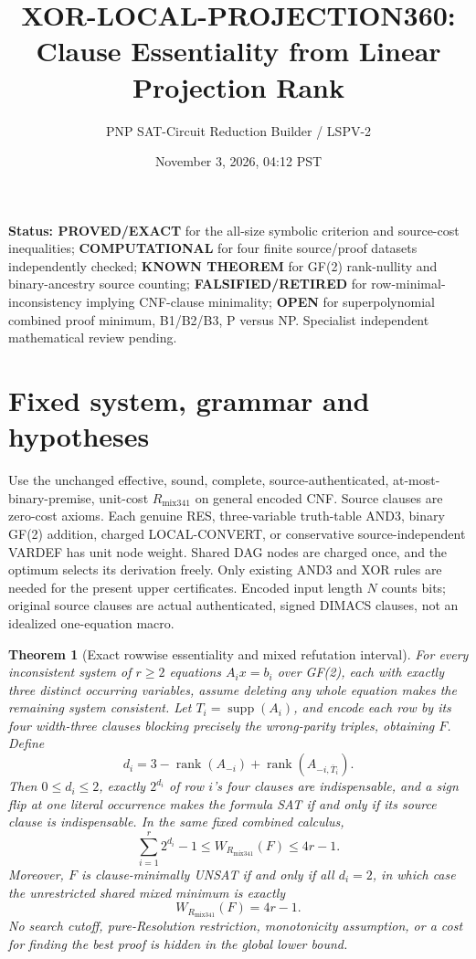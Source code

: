\documentclass[11pt]{article}
\title{XOR-LOCAL-PROJECTION360: Clause Essentiality from Linear Projection Rank}
\author{PNP SAT-Circuit Reduction Builder / LSPV-2}
\date{November 3, 2026, 04:12 PST}
\newtheorem{theorem}{Theorem}
\begin{document}
\maketitle
\noindent\textbf{Status: PROVED/EXACT} for the all-size symbolic criterion and source-cost inequalities; \textbf{COMPUTATIONAL} for four finite source/proof datasets independently checked; \textbf{KNOWN THEOREM} for GF(2) rank-nullity and binary-ancestry source counting; \textbf{FALSIFIED/RETIRED} for row-minimal-inconsistency implying CNF-clause minimality; \textbf{OPEN} for superpolynomial combined proof minimum, B1/B2/B3, P versus NP. Specialist independent mathematical review pending.

\section*{Fixed system, grammar and hypotheses}
Use the unchanged effective, sound, complete, source-authenticated, at-most-binary-premise, unit-cost $R_{\mathrm{mix341}}$ on general encoded CNF. Source clauses are zero-cost axioms. Each genuine RES, three-variable truth-table AND3, binary GF(2) addition, charged LOCAL-CONVERT, or conservative source-independent VARDEF has unit node weight. Shared DAG nodes are charged once, and the optimum selects its derivation freely. Only existing AND3 and XOR rules are needed for the present upper certificates. Encoded input length $N$ counts bits; original source clauses are actual authenticated, signed DIMACS clauses, not an idealized one-equation macro.

\begin{theorem}[Exact rowwise essentiality and mixed refutation interval]
For every inconsistent system of $r\ge2$ equations $A_ix=b_i$ over GF(2), each with exactly three distinct occurring variables, assume deleting any whole equation makes the remaining system consistent. Let $T_i=\operatorname{supp}(A_i)$, and encode each row by its four width-three clauses blocking precisely the wrong-parity triples, obtaining $F$. Define
\[
d_i=3-\operatorname{rank}(A_{-i})+
\operatorname{rank}(A_{-i,\overline T_i}).
\]
Then $0\le d_i\le2$, exactly $2^{d_i}$ of row $i$'s four clauses are indispensable, and a sign flip at one literal occurrence makes the formula SAT if and only if its source clause is indispensable. In the same fixed combined calculus,
\[
\boxed{\sum_{i=1}^{r}2^{d_i}-1\le W_{R_{\mathrm{mix341}}}(F)\le4r-1.}
\]
Moreover, $F$ is clause-minimally UNSAT if and only if all $d_i=2$, in which case the unrestricted shared mixed minimum is \emph{exactly}
\[
\boxed{W_{R_{\mathrm{mix341}}}(F)=4r-1.}
\]
No search cutoff, pure-Resolution restriction, monotonicity assumption, or a cost for finding the best proof is hidden in the global lower bound.
\end{theorem}
\end{document}

